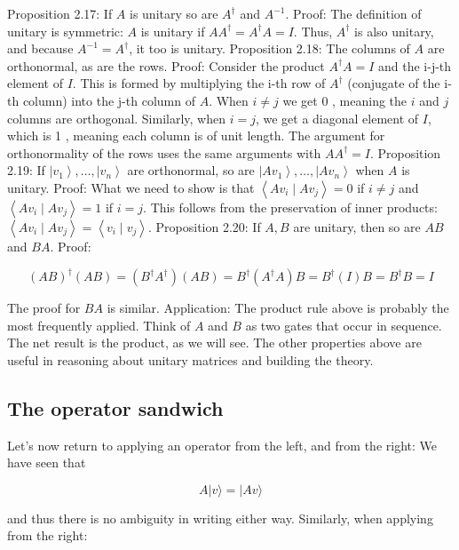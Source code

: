 \documentclass[main.tex]{subfiles}
\begin{document}
    Proposition 2.17: If $A$ is unitary so are $A^{\dagger}$ and $A^{-1}$. Proof: The definition of unitary is symmetric: $A$ is unitary if $A A^{\dagger}=A^{\dagger} A=I$. Thus, $A^{\dagger}$ is also unitary, and because $A^{-1}=A^{\dagger}$, it too is unitary. Proposition 2.18: The columns of $A$ are orthonormal, as are the rows. Proof: Consider the product $A^{\dagger} A=I$ and the i-j-th element of $I$. This is formed by multiplying the i-th row of $A^{\dagger}$ (conjugate of the $\mathrm{i}$-th column) into the j-th column of $A$. When $i \neq j$ we get 0 , meaning the $i$ and $j$ columns are orthogonal. Similarly, when $i=j$, we get a diagonal element of $I$, which is 1 , meaning each column is of unit length. The argument for orthonormality of the rows uses the same arguments with $A A^{\dagger}=I$. Proposition 2.19: If $\left|v_{1}\right\rangle, \ldots,\left|v_{n}\right\rangle$ are orthonormal, so are $\left|A v_{1}\right\rangle, \ldots,\left|A v_{n}\right\rangle$ when $A$ is unitary. Proof: What we need to show is that $\left\langle A v_{i} \mid A v_{j}\right\rangle=0$ if $i \neq j$ and $\left\langle A v_{i} \mid A v_{j}\right\rangle=1$ if $i=j$. This follows from the preservation of inner products: $\left\langle A v_{i} \mid A v_{j}\right\rangle=\left\langle v_{i} \mid v_{j}\right\rangle$. Proposition 2.20: If $A, B$ are unitary, then so are $A B$ and $B A$. Proof:
    
    $$
    (A B)^{\dagger}(A B)=\left(B^{\dagger} A^{\dagger}\right)(A B)=B^{\dagger}\left(A^{\dagger} A\right) B=B^{\dagger}(I) B=B^{\dagger} B=I
    $$
    
    The proof for $B A$ is similar. Application: The product rule above is probably the most frequently applied. Think of $A$ and $B$ as two gates that occur in sequence. The net result is the product, as we will see. The other properties above are useful in reasoning about unitary matrices and building the theory.

\subsection{The operator sandwich}

    Let's now return to applying an operator from the left, and from the right: We have seen that
    
    $$
    A|v\rangle=|A v\rangle
    $$
    
    and thus there is no ambiguity in writing either way. Similarly, when applying from the right:
    
\end{document}
